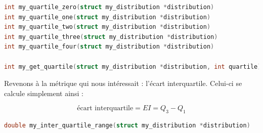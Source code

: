 \documentclass[11pt,a4paper]{article}
\begin{document}
\bigskip


\begin{lstlisting}[language=C,morekeywords={floor,ceil}]
int my_quartile_zero(struct my_distribution *distribution)
int my_quartile_one(struct my_distribution *distribution)
int my_quartile_two(struct my_distribution *distribution)
int my_quartile_three(struct my_distribution *distribution)
int my_quartile_four(struct my_distribution *distribution)

int my_get_quartile(struct my_distribution *distribution, int quartile) \end{lstlisting}


\bigskip

Revenons à la métrique qui nous intéressait : l'écart interquartile.
Celui-ci se calcule simplement ainsi :

\begin{center} %
\begin{equation*}
\text{écart interquartile} = EI = Q_{3} - Q_{1}
\end{equation*}
\end{center}


\bigskip

\begin{lstlisting}[language=C,morekeywords={floor,ceil}]
double my_inter_quartile_range(struct my_distribution *distribution) \end{lstlisting}
\end{document}
